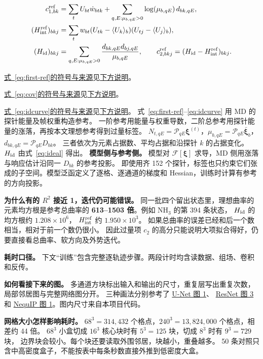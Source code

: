 \documentclass[UTF8,fontset=fandol,11pt]{ctexart}
\newcommand{\xiF}{\bm\xi}
\newcommand{\X}{\bar{\bm\xi}}
\newcommand{\fref}[2]{\par{\footnotesize \hyperref[#1]{式~\ref{#1}的符号与来源}见\hyperref[#2]{下方说明}。}}
\newcommand{\defat}[1]{\phantomsection\label{#1}}
\begin{document}
\begin{align}
 c^{\rm ref}_{1,bk}
 &=\sum_t U_{bt}\dot w_{btk}
   +\sum_{q,E:\mu_{b,qE}>0}\log(\mu_{b,qE})\,d_{bk,qE},
   \label{eq:first-ref}\\
 (H_{\rm int}^{\rm ref})_{bkj}
 &=\sum_t w_{bt}(U_{tk}-\langle U_k\rangle_b)(U_{tj}-\langle U_j\rangle_b),\label{eq:cov}\\
 (H_{\rm id})_{bkj}
 &=\sum_{q,E:\mu_{b,qE}>0}\frac{d_{bk,qE}d_{bj,qE}}{\mu_{b,qE}},
 \qquad c^{\rm ref}_{2,bkj}=(H_{\rm id}-H_{\rm int}^{\rm ref})_{bkj}.
 \label{eq:idcurve}
\end{align}
\fref{eq:first-ref}{def:cov}
\fref{eq:cov}{def:cov}
\fref{eq:idcurve}{def:cov}
\defat{def:cov}
式~\ref{eq:first-ref}–\ref{eq:idcurve} 用 MD 的探针能量及帧权重构造参考。
一阶参考用能量与权重导数，二阶总参考用探针能量的涨落，再按本文理想参考得到过量标签。
$N_{t,qE}=\mathcal P_{qE}\xiF^{(t)}$，$\mu_{b,qE}=\mathcal P_{qE}\X_b$，$d_{bk,qE}=\mathcal P_{qE}D_{bk}$。
三者依次为元素占据数、平均占据和沿探针 $k$ 的占据变化。$H_{\rm id}$ 由式~\ref{eq:ideal} 得出。
\textbf{模型侧与参考侧。} 模型对 $\mathcal F[\xiF]$ 求导，MD 侧用涨落与响应估计沿同一 $D_{bk}$ 的参考投影。
即使用齐 152 个探针，标签也只约束它们张成的子空间。模型泛函定义了逐格、逐通道的梯度和 Hessian，训练时计算有参考的方向投影。

\textbf{为什么有的 \(R^2\) 接近 1，迭代仍可能错误。}
同一批四个留出状态里，理想曲率的元素均方根是参考总曲率的
\textbf{613–1503 倍}。例如 NH$_3$ 的第 394 条状态，
\(H_{\rm id}\) 的均方根约 \(1.208\times10^6\)，
\(H_{\rm int}^{\rm ref}\) 约 \(1.950\times10^3\)。
如果总曲率的误差已经和后一个数相当，相对于前一个数仍很小。
因此过量项 \(c_2\) 的高分只能说明大项拟合得好，仍要直接看总曲率、软方向及外势迭代。

\textbf{耗时口径。} 下文“训练”包含完整逐轨迹步骤。两段计时均含读数据、组场、卷积和反传。

\textbf{如何看接下来的图。}
多通道方块标出输入和输出的尺寸，重复层写出重复次数，局部邻居图与完整网络图分开。
三种画法分别参考了 \href{https://arxiv.org/pdf/1505.04597}{U-Net 图 1}、
\href{https://openaccess.thecvf.com/content_cvpr_2016/papers/He_Deep_Residual_Learning_CVPR_2016_paper.pdf}{ResNet 图 3} 和
\href{https://pmc.ncbi.nlm.nih.gov/articles/PMC9068614/#Fig1}{NequIP 图 1}。图内尺寸来自本项目代码。

\textbf{网格大小怎样影响耗时。}
\(68^3=314{,}432\) 个格点，\(240^3=13{,}824{,}000\) 个格点，相差约 44 倍。
\(68^3\) 小盒切成 \(16^3\) 核心块时有 \(5^3=125\) 块，切成 \(8^3\) 时有 \(9^3=729\) 块，
边界块会较小。每个块还要读取外围邻居，块越小，重叠越多。
50 条对照只含中高密度盒子，不能按表中每条秒数直接外推到低密度大盒。
\end{document}
